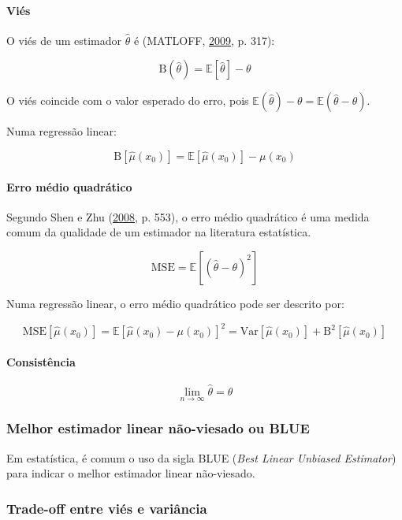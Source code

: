 \documentclass[a4paper, 12pt]{article}
\let\oldparagraph\paragraph
\renewcommand{\paragraph}[1]{\oldparagraph{#1}\mbox{}}
\begin{document}
\paragraph{Viés}\label{vies}

O viés de um estimador \(\hat{\theta}\) é (MATLOFF,
\protect\hyperlink{ref-matloff2009}{2009}, p. 317):

\[\text{B}(\hat{\theta}) = \mathbb{E}[\hat{\theta}] - \theta\]

O viés coincide com o valor esperado do erro, pois
\(\mathbb{E}(\hat{\theta}) - \theta = \mathbb{E}(\hat{\theta}-\theta)\).

Numa regressão linear:

\[\text{B}[\hat{\mu}(x_0)] = \mathbb{E}[\hat{\mu}(x_0)] - \mu(x_0)\]

\paragraph{Erro médio quadrático}\label{erro-medio-quadratico}

Segundo Shen e Zhu (\protect\hyperlink{ref-shen}{2008}, p. 553), o erro
médio quadrático é uma medida comum da qualidade de um estimador na
literatura estatística.

\[\text{MSE} = \mathbb{E}[(\hat{\theta} - \theta)^2]\]

Numa regressão linear, o erro médio quadrático pode ser descrito por:

\[\text{MSE}[\hat{\mu}(x_0)] = \mathbb{E}[\hat{\mu}(x_0) - \mu(x_0)]^2 = \text{Var}[\hat{\mu}(x_0)] + \text{B}^2[\hat{\mu}(x_0)]\]

\paragraph{Consistência}\label{consistencia}

\[\lim_{n \rightarrow \infty}\hat{\theta} = \theta\]

\subsubsection{Melhor estimador linear não-viesado ou
BLUE}\label{melhor-estimador-linear-nao-viesado-ou-blue}

Em estatística, é comum o uso da sigla BLUE (\emph{Best Linear Unbiased
Estimator}) para indicar o melhor estimador linear não-viesado.

\subsubsection{Trade-off entre viés e
variância}\label{trade-off-entre-vies-e-variancia}
\end{document}
